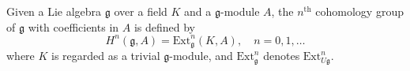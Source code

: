Given a Lie algebra $\mathfrak{g}$ over a field $K$ and a $\mathfrak{g}$-module $A$, the $n^{\text{th}}$ cohomology group of $\mathfrak{g}$ with coefficients in $A$ is defined by
$$H^n(\mathfrak{g}, A) = \text{Ext}_{\mathfrak{g}}^n(K, A), \quad n = 0, 1, \ldots$$
where $K$ is regarded as a trivial $\mathfrak{g}$-module, and $\text{Ext}_{\mathfrak{g}}^n$ denotes $\text{Ext}_{U\mathfrak{g}}^n$.
